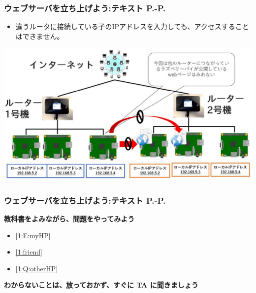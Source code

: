 \documentclass[dvipdfmx]{beamer}
\begin{document}
\begin{frame}[fragile]
	\frametitle{ウェブサーバを立ち上げよう:テキスト P.\pageref{1:P:HP}-P.\pageref{1:P:CGI}~~~}
            \begin{itemize} 
                \item 違うルータに接続している子のIPアドレスを入力しても、アクセスすることはできません。
            \end{itemize}
			\begin{minipage}{\textwidth}
                {\upshape
                  \includegraphics[width=\textwidth]{ome7-img045}}
            \end{minipage}
\end{frame}

\begin{frame}[fragile]
	\frametitle{ウェブサーバを立ち上げよう:テキスト P.\pageref{1:P:HP}-P.\pageref{1:P:CGI}~~~}
      \large\textbf{教科書をよみながら、問題をやってみよう}
				\begin{itemize}
					\item \ref*{1:E:myHP}
					\item \ref*{1:friend} 
					\item \ref*{1:Q:otherHP} 
				\end{itemize}
      \vfill
      \large\textbf{わからないことは、放っておかず、すぐに TA に聞きましょう}
\end{frame}
\end{document}
